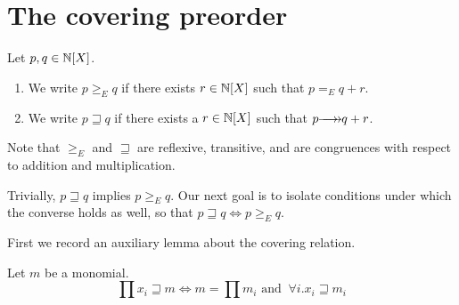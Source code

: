 \documentclass[numbers=enddot]{scrartcl}
\newcommand{\gtE}{\geq_E}
\newcommand{\cov}{\sqsupseteq}
\begin{document}
\section{The covering preorder}

\begin{dfn} Let $p, q \in \mathbb{N}[X]$.
\begin{enumerate}
  \item We write $p \gtE q$ if there exists $r \in \mathbb{N}[X]$
  such that $p =_E q + r$.
  \item We write $p \cov q$ if there exists a $r\in \mathbb{N}[X]$ such that
  $p \thra q + r$.
\end{enumerate}
\end{dfn}

Note that $\gtE$ and $\cov$ are reflexive, transitive, and are congruences
with respect to addition and multiplication.

Trivially, $p \cov q$ implies $p \gtE q$.
Our next goal is to isolate conditions under which
the converse holds as well, so that $p \cov q \iff p \gtE q$.

First we record an auxiliary lemma about the covering relation.

\begin{prop}
  \label{p:cov2} Let $m$ be a monomial.
  \[\prod x_i \cov m \iff m = \prod m_i \text{ and }\ \forall i. x_i \cov m_i\]
\end{prop}
\end{document}
